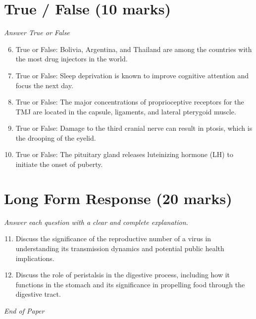 \documentclass[12pt]{article}
\begin{document}
\section*{True / False (10 marks)}
\textit{Answer True or False}
\begin{enumerate}[label=\arabic*.]
\setcounter{enumi}{5}
\item True or False: Bolivia, Argentina, and Thailand are among the countries with the most drug injectors in the world.
\item True or False: Sleep deprivation is known to improve cognitive attention and focus the next day.
\item True or False: The major concentrations of proprioceptive receptors for the TMJ are located in the capsule, ligaments, and lateral pterygoid muscle.
\item True or False: Damage to the third cranial nerve can result in ptosis, which is the drooping of the eyelid.
\item True or False: The pituitary gland releases luteinizing hormone (LH) to initiate the onset of puberty.
\end{enumerate}

\section*{Long Form Response (20 marks)}
\textit{Answer each question with a clear and complete explanation.}
\begin{enumerate}[label=\arabic*.]
\setcounter{enumi}{10}
\item Discuss the significance of the reproductive number of a virus in understanding its transmission dynamics and potential public health implications.
\item Discuss the role of peristalsis in the digestive process, including how it functions in the stomach and its significance in propelling food through the digestive tract.
\end{enumerate}

\vfill
\noindent\textit{End of Paper}
\end{document}
